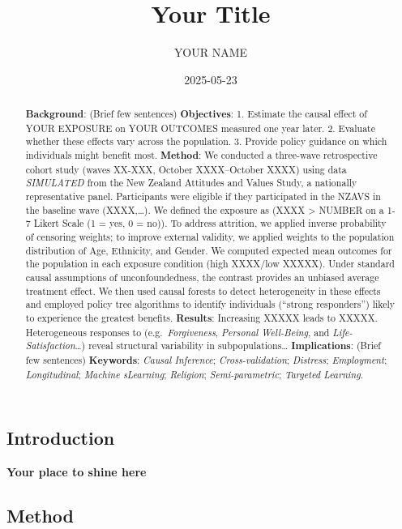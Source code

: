 \documentclass[
  single column]{article}
\title{Your Title}
\author{YOUR NAME}
\date{2025-05-23}
\begin{document}
\maketitle
\begin{abstract}
\textbf{Background}: (Brief few sentences) \textbf{Objectives}: 1.
Estimate the causal effect of YOUR EXPOSURE on YOUR OUTCOMES measured
one year later. 2. Evaluate whether these effects vary across the
population. 3. Provide policy guidance on which individuals might
benefit most. \textbf{Method}: We conducted a three-wave retrospective
cohort study (waves XX-XXX, October XXXX--October XXXX) using data
\emph{SIMULATED} from the New Zealand Attitudes and Values Study, a
nationally representative panel. Participants were eligible if they
participated in the NZAVS in the baseline wave (XXXX,\ldots). We defined
the exposure as (XXXX \textgreater{} NUMBER on a 1-7 Likert Scale (1 =
yes, 0 = no)). To address attrition, we applied inverse probability of
censoring weights; to improve external validity, we applied weights to
the population distribution of Age, Ethnicity, and Gender. We computed
expected mean outcomes for the population in each exposure condition
(high XXXX/low XXXXX). Under standard causal assumptions of
unconfoundedness, the contrast provides an unbiased average treatment
effect. We then used causal forests to detect heterogeneity in these
effects and employed policy tree algorithms to identify individuals
(``strong responders'') likely to experience the greatest benefits.
\textbf{Results}: Increasing XXXXX leads to XXXXX. Heterogeneous
responses to (e.g.~\emph{Forgiveness}, \emph{Personal Well-Being}, and
\emph{Life-Satisfaction}\ldots) reveal structural variability in
subpopulations\ldots{} \textbf{Implications}: (Brief few sentences)
\textbf{Keywords}: \emph{Causal Inference}; \emph{Cross-validation};
\emph{Distress}; \emph{Employment}; \emph{Longitudinal}; \emph{Machine
sLearning}; \emph{Religion}; \emph{Semi-parametric}; \emph{Targeted
Learning}.
\end{abstract}


\newpage{}

\subsection{Introduction}\label{introduction}

\textbf{Your place to shine here}

\subsection{Method}\label{method}
\end{document}

